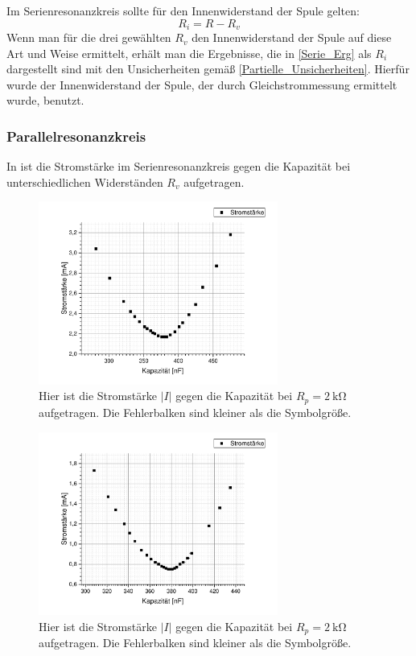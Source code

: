 \documentclass[
	a4paper,
	12pt,
	pagesize,
	ngerman
]{scrartcl}
\begin{document}
	Im Serienresonanzkreis sollte für den Innenwiderstand der Spule gelten:
	\begin{equation}
		R_i=R-R_v
		\label{Verlust}
	\end{equation}
	Wenn man für die drei gewählten $R_v$ den Innenwiderstand der Spule auf diese Art und Weise ermittelt, erhält man die Ergebnisse, die in \cref{Serie_Erg} als $R_i$ dargestellt sind mit den Unsicherheiten gemäß \cref{Partielle_Unsicherheiten}.
	Hierfür wurde der Innenwiderstand der Spule, der durch Gleichstrommessung ermittelt wurde, benutzt.\\
	\subsubsection{Parallelresonanzkreis}
	
	In  ist die Stromstärke im Serienresonanzkreis gegen die Kapazität bei unterschiedlichen Widerständen $ R_v $ aufgetragen.
	\begin{figure}[H]
		\includegraphics[width=0.7\textwidth]{Parallelstromkreis_2k}
		\centering
		\caption{Hier ist die Stromstärke $ \left| I \right| $ gegen die Kapazität bei $ R_p = \SI{2}{\kilo \ohm} $ aufgetragen. Die Fehlerbalken sind kleiner als die Symbolgröße.}
		\label{Para_2k}
		\centering
	\end{figure} 
	\begin{figure}[H]
		\includegraphics[width=0.7\textwidth]{Parallelstromkreis_10k}
		\centering
		\caption{Hier ist die Stromstärke $ \left| I \right| $ gegen die Kapazität bei $ R_p = \SI{2}{\kilo \ohm} $ aufgetragen. Die Fehlerbalken sind kleiner als die Symbolgröße.}
		\label{Para_10k}
		\centering
	\end{figure} 
\end{document}

